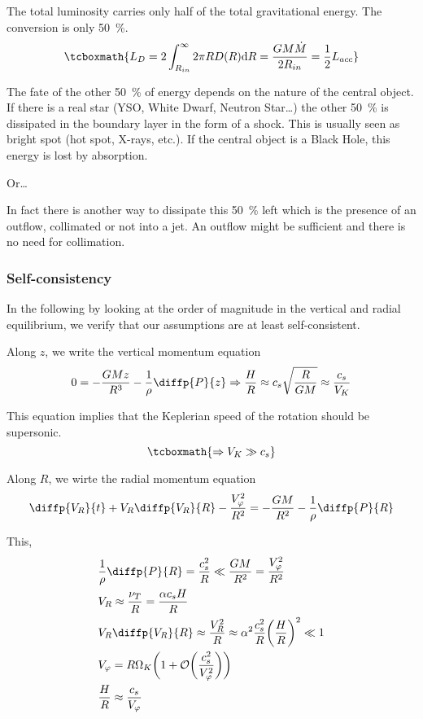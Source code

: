 \documentclass[10pt,a4paper,english,draft]{article}
\let\originalleft\left
\let\originalright\right
\renewcommand{\left}{\mathopen{}\mathclose\bgroup\originalleft}
\renewcommand{\right}{\aftergroup\egroup\originalright}
\begin{document}
The total luminosity carries only half of the total gravitational energy. The
conversion is only \SI{50}{\percent}.
\begin{equation}
    \tcboxmath{
        L_D = 2 \int_{R_{in}}^{\infty} 2 \pi R D(R) \d{R} = \frac{G M \dot{M}}{2 R_{in}} = \frac{1}{2} L_{acc}
    }
\end{equation}

The fate of the other \SI{50}{\percent} of energy depends on the nature of the
central object. If there is a real star (YSO, White Dwarf, Neutron Star…) the
other \SI{50}{\percent} is dissipated in the boundary layer in the form of a
shock. This is usually seen as bright spot (hot spot, X-rays, etc.). If the
central object is a Black Hole, this energy is lost by absorption.

Or…

In fact there is another way to dissipate this \SI{50}{\percent} left which is
the presence of an outflow, collimated or not into a jet. An outflow might be
sufficient and there is no need for collimation.

\subsubsection{Self-consistency}

In the following by looking at the order of magnitude in the vertical and
radial equilibrium, we verify that our assumptions are at least
self-consistent.

Along $z$, we write the vertical momentum equation
\begin{equation}
    0 = - \frac{G M z} {R^3} - \frac{1}{\rho} \diffp{P}{z} \Rightarrow \frac{H}{R} \approx c_s \sqrt{\frac{R}{G M}} \approx \frac{c_s}{V_K}
\end{equation}

This equation implies that the Keplerian speed of the rotation should be supersonic.
\begin{equation}
    \tcboxmath{
        \Rightarrow V_K \gg c_s
    }
\end{equation}

Along $R$, we wirte the radial momentum equation
\begin{equation}
    \diffp{V_R}{t} + V_R \diffp{V_R}{R} - \frac{V_\varphi^2}{R^2} = - \frac{G M}{R^2} - \frac{1}{\rho} \diffp{P}{R}
\end{equation}

This,
\begin{align*}
    & \frac{1}{\rho} \diffp{P}{R} = \frac{c_s^2}{R} \ll \frac{G M}{R^2} = \frac{V_\varphi^2}{R^2} \\
    & V_R \approx \frac{\nu_T}{R} = \frac{\alpha c_s H}{R} \\
    & V_R \diffp{V_R}{R} \approx \frac{V_R^2}{R} \approx \alpha^2 \frac{c_s^2}{R} \left(\frac{H}{R}\right)^2 \ll 1\\
    & V_\varphi = R \Omega_K \left(1 + \mathcal{O}\left(\frac{c_s^2}{V_\varphi^2}\right) \right) \\
    & \frac{H}{R} \approx \frac{c_s}{V_\varphi}
\end{align*}
\end{document}
